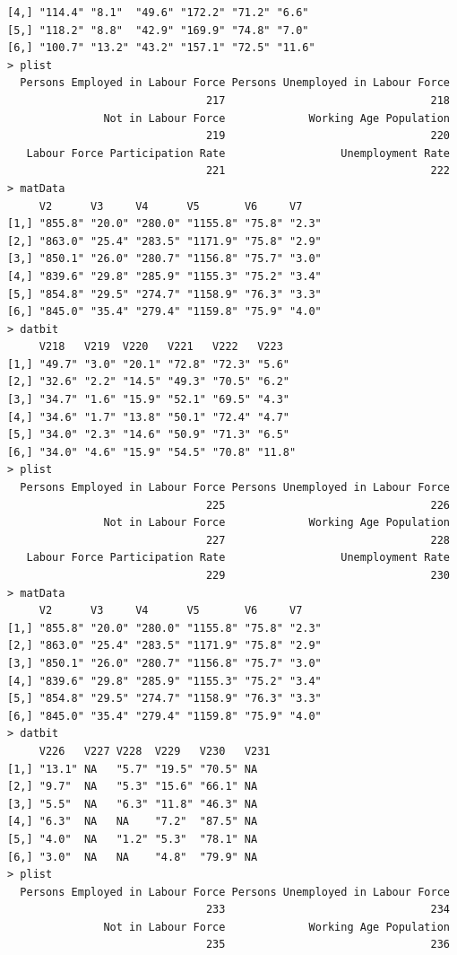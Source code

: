 \documentclass[a4paper]{article}
\begin{document}
\begin{verbatim}
[4,] "114.4" "8.1"  "49.6" "172.2" "71.2" "6.6" 
[5,] "118.2" "8.8"  "42.9" "169.9" "74.8" "7.0" 
[6,] "100.7" "13.2" "43.2" "157.1" "72.5" "11.6"
> plist 
  Persons Employed in Labour Force Persons Unemployed in Labour Force 
                               217                                218 
               Not in Labour Force             Working Age Population 
                               219                                220 
   Labour Force Participation Rate                  Unemployment Rate 
                               221                                222 
> matData 
     V2      V3     V4      V5       V6     V7   
[1,] "855.8" "20.0" "280.0" "1155.8" "75.8" "2.3"
[2,] "863.0" "25.4" "283.5" "1171.9" "75.8" "2.9"
[3,] "850.1" "26.0" "280.7" "1156.8" "75.7" "3.0"
[4,] "839.6" "29.8" "285.9" "1155.3" "75.2" "3.4"
[5,] "854.8" "29.5" "274.7" "1158.9" "76.3" "3.3"
[6,] "845.0" "35.4" "279.4" "1159.8" "75.9" "4.0"
> datbit 
     V218   V219  V220   V221   V222   V223  
[1,] "49.7" "3.0" "20.1" "72.8" "72.3" "5.6" 
[2,] "32.6" "2.2" "14.5" "49.3" "70.5" "6.2" 
[3,] "34.7" "1.6" "15.9" "52.1" "69.5" "4.3" 
[4,] "34.6" "1.7" "13.8" "50.1" "72.4" "4.7" 
[5,] "34.0" "2.3" "14.6" "50.9" "71.3" "6.5" 
[6,] "34.0" "4.6" "15.9" "54.5" "70.8" "11.8"
> plist 
  Persons Employed in Labour Force Persons Unemployed in Labour Force 
                               225                                226 
               Not in Labour Force             Working Age Population 
                               227                                228 
   Labour Force Participation Rate                  Unemployment Rate 
                               229                                230 
> matData 
     V2      V3     V4      V5       V6     V7   
[1,] "855.8" "20.0" "280.0" "1155.8" "75.8" "2.3"
[2,] "863.0" "25.4" "283.5" "1171.9" "75.8" "2.9"
[3,] "850.1" "26.0" "280.7" "1156.8" "75.7" "3.0"
[4,] "839.6" "29.8" "285.9" "1155.3" "75.2" "3.4"
[5,] "854.8" "29.5" "274.7" "1158.9" "76.3" "3.3"
[6,] "845.0" "35.4" "279.4" "1159.8" "75.9" "4.0"
> datbit 
     V226   V227 V228  V229   V230   V231
[1,] "13.1" NA   "5.7" "19.5" "70.5" NA  
[2,] "9.7"  NA   "5.3" "15.6" "66.1" NA  
[3,] "5.5"  NA   "6.3" "11.8" "46.3" NA  
[4,] "6.3"  NA   NA    "7.2"  "87.5" NA  
[5,] "4.0"  NA   "1.2" "5.3"  "78.1" NA  
[6,] "3.0"  NA   NA    "4.8"  "79.9" NA  
> plist 
  Persons Employed in Labour Force Persons Unemployed in Labour Force 
                               233                                234 
               Not in Labour Force             Working Age Population 
                               235                                236 

\end{verbatim}
\end{document}
